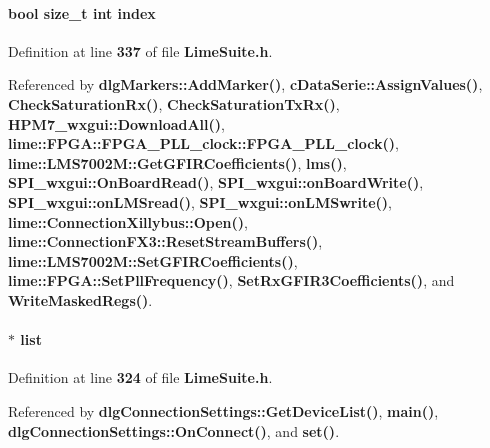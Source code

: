 \paragraph[{index}]{\setlength{\rightskip}{0pt plus 5cm}bool size\+\_\+t {\bf int} index}\label{group__FN__HIGH__LVL_ga69eaff271a229e3b1f15d41b48dc0c08}


Definition at line {\bf 337} of file {\bf Lime\+Suite.\+h}.



Referenced by {\bf dlg\+Markers\+::\+Add\+Marker()}, {\bf c\+Data\+Serie\+::\+Assign\+Values()}, {\bf Check\+Saturation\+Rx()}, {\bf Check\+Saturation\+Tx\+Rx()}, {\bf H\+P\+M7\+\_\+wxgui\+::\+Download\+All()}, {\bf lime\+::\+F\+P\+G\+A\+::\+F\+P\+G\+A\+\_\+\+P\+L\+L\+\_\+clock\+::\+F\+P\+G\+A\+\_\+\+P\+L\+L\+\_\+clock()}, {\bf lime\+::\+L\+M\+S7002\+M\+::\+Get\+G\+F\+I\+R\+Coefficients()}, {\bf lms()}, {\bf S\+P\+I\+\_\+wxgui\+::\+On\+Board\+Read()}, {\bf S\+P\+I\+\_\+wxgui\+::on\+Board\+Write()}, {\bf S\+P\+I\+\_\+wxgui\+::on\+L\+M\+Sread()}, {\bf S\+P\+I\+\_\+wxgui\+::on\+L\+M\+Swrite()}, {\bf lime\+::\+Connection\+Xillybus\+::\+Open()}, {\bf lime\+::\+Connection\+F\+X3\+::\+Reset\+Stream\+Buffers()}, {\bf lime\+::\+L\+M\+S7002\+M\+::\+Set\+G\+F\+I\+R\+Coefficients()}, {\bf lime\+::\+F\+P\+G\+A\+::\+Set\+Pll\+Frequency()}, {\bf Set\+Rx\+G\+F\+I\+R3\+Coefficients()}, and {\bf Write\+Masked\+Regs()}.

\paragraph[{list}]{ $\ast$ list}\label{group__FN__HIGH__LVL_gab1fde1d41a8c00a4279c80226c9153e3}


Definition at line {\bf 324} of file {\bf Lime\+Suite.\+h}.



Referenced by {\bf dlg\+Connection\+Settings\+::\+Get\+Device\+List()}, {\bf main()}, {\bf dlg\+Connection\+Settings\+::\+On\+Connect()}, and {\bf set()}.


